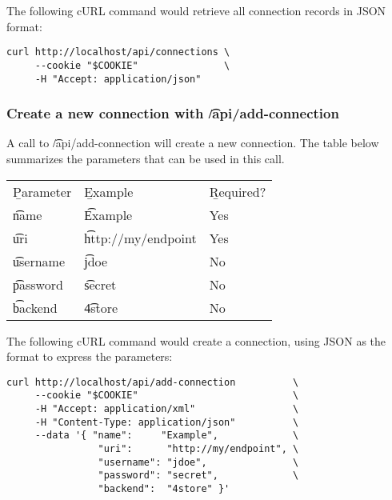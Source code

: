   The following cURL command would retrieve all connection records in JSON
  format:

\begin{lstlisting}
curl http://localhost/api/connections \
     --cookie "$COOKIE"               \
     -H "Accept: application/json"
\end{lstlisting}

\subsubsection{Create a new connection with \t{/api/add-connection}}
\label{sec:api-create-connection}

  A call to \t{/api/add-connection} will create a new connection.
  The table below summarizes the parameters that can be used in this call.

  \hypersetup{urlcolor=black}
  \begin{table}[H]
    \begin{tabularx}{\textwidth}{l!{\VRule[-1pt]}X!{\VRule[-1pt]}X}
      \headrow
      \b{Parameter} & \b{Example}            & \b{Required?}\\
      \evenrow
      \t{name}      & \t{Example}            & Yes\\
      \oddrow
      \t{uri}       & \t{http://my/endpoint} & Yes\\
      \evenrow
      \t{username}  & \t{jdoe}               & No\\
      \oddrow
      \t{password}  & \t{secret}             & No\\
      \evenrow
      \t{backend}   & \t{4store}             & No\\
    \end{tabularx}
  \end{table}
  \hypersetup{urlcolor=LinkGray}

  The following cURL command would create a connection, using JSON as
  the format to express the parameters:

\begin{lstlisting}
curl http://localhost/api/add-connection          \
     --cookie "$COOKIE"                           \
     -H "Accept: application/xml"                 \
     -H "Content-Type: application/json"          \
     --data '{ "name":     "Example",             \
                "uri":      "http://my/endpoint", \
                "username": "jdoe",               \
                "password": "secret",             \
                "backend":  "4store" }'
\end{lstlisting}

